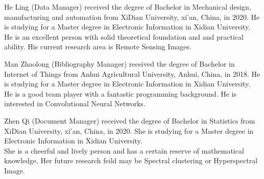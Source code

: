 \documentclass[journal,comsoc]{IEEEtran}
\begin{document}
\begin{IEEEbiography}{He Ling}
(Data Manager) received the degree of  Bachelor in Mechanical design, manufacturing and automation from XiDian University, xi'an, China, in 2020. He is studying for a Master degree in Electronic Information in Xidian University.\\
\hspace*{0.2cm}He is an excellent person with solid theoretical foundation and and practical ability. His current research area is Remote Sensing Images.
\end{IEEEbiography}

\begin{IEEEbiography}{Man Zhaolong}
(Bibliography Manager) received the degree  of Bachelor in Internet of Things from Anhui Agricultural University, Anhui, China, in 2018. He is studying for a Master degree in Electronic Information in Xidian University.\\
\hspace*{0.2cm}He is a good team player with a fantastic programming background. He is interested in Convolutional Neural Networks.
\end{IEEEbiography}


\begin{IEEEbiography}{Zhen Qi}
(Document Manager) received the degree of  Bachelor in Statistics from XiDian University, xi'an, China, in 2020. She is studying for a Master degree in Electronic Information in Xidian University.\\
\hspace*{0.2cm}She is a cheerful and lively person and has a certain reserve of mathematical knowledge. Her future research feild may be Spectral clustering or Hyperspectral Image.
\end{IEEEbiography}
\end{document}
